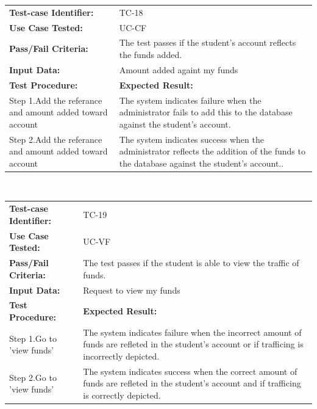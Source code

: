 \documentclass[12pt]{article}
\begin{document}
{\begin{tabular}{| p{8cm} | p{8cm} |} \hline
	\textbf{Test-case Identifier:}& TC-18\\
	\textbf{Use Case Tested:}& UC-CF\\
	\textbf{Pass/Fail Criteria:}& The test passes if the student's account reflects the funds added.\\
	\textbf{Input Data:}& Amount added againt my funds\\\hline
	\textbf{Test Procedure:}& \textbf{Expected Result:} \\\hline
	Step 1.Add the referance and amount added toward account & The system indicates failure when the administrator fails to add this to the database against the student's account. \\
	Step 2.Add the referance and amount added toward account & The system indicates success when the administrator reflects the addition of the funds  to the database against the student's account..\\
		\hline
\end{tabular}
\\

\begin{tabular}{| p{8cm} | p{8cm} |} \hline
	\textbf{Test-case Identifier:}& TC-19\\
	\textbf{Use Case Tested:}& UC-VF\\
	\textbf{Pass/Fail Criteria:}& The test passes if the student is able to view the traffic of funds.\\
	\textbf{Input Data:}& Request to view my funds\\\hline
	\textbf{Test Procedure:}& \textbf{Expected Result:} \\\hline
	Step 1.Go to 'view funds' & The system indicates failure when the incorrect  amount of funds are refleted in the student's account or if trafficing is incorrectly depicted. \\
	Step 2.Go to 'view funds' & The system indicates success when the correct  amount of funds are refleted in the student's account and if trafficing is correctly depicted.\\
		\hline
\end{tabular}
\\

}
\end{document}
